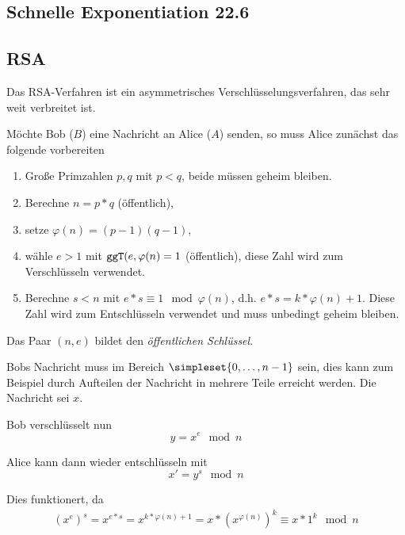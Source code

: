 \subsection{Schnelle Exponentiation 22.6}
\subsection{RSA}
Das RSA-Verfahren ist ein asymmetrisches Verschlüsselungsverfahren, das sehr weit verbreitet ist.

Möchte Bob  ($B$) eine Nachricht an Alice ($A$) senden, so muss Alice zunächst das folgende vorbereiten 
\begin{enumerate}
	\item Große Primzahlen $p,q$ mit $p<q$, beide müssen geheim bleiben.
	\item Berechne $n=p*q$ (öffentlich),
	\item setze $\varphi(n)=(p-1)(q-1)$,
	\item wähle $e>1$ mit $\texttt{ggT}(e,\varphi(n)=1$ (öffentlich), diese Zahl wird zum Verschlüsseln verwendet.
	\item Berechne $s<n$ mit $e*s\equiv 1\mod \varphi(n)$, d.h. $e*s=k*\varphi(n)+1$. Diese Zahl wird zum Entschlüsseln verwendet und muss unbedingt geheim bleiben.
\end{enumerate}
Das Paar $(n,e)$ bildet den \emph{öffentlichen Schlüssel}.

Bobs Nachricht muss im Bereich $\simpleset{0,\ldots,n-1}$ sein, dies kann zum Beispiel durch Aufteilen der Nachricht in mehrere Teile erreicht werden. Die Nachricht sei $x$.

Bob verschlüsselt nun
\begin{equation*}
	y=x^e\mod n
\end{equation*}

Alice kann dann wieder entschlüsseln mit
\begin{equation*}
	x'=y^s\mod n
\end{equation*}

Dies funktionert, da
\begin{align*}
	(x^e)^s = x^{e*s}=x^{k*\varphi(n)+1}=x*(x^{\varphi(n)})^k\equiv x*1^k\mod n
\end{align*}